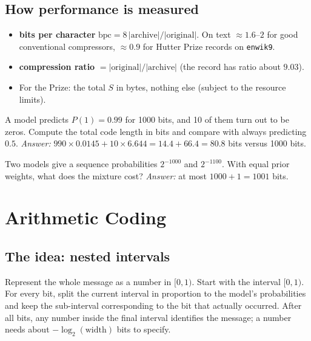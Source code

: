 \documentclass[11pt,a4paper,openany]{book}
\newcommand{\bpc}{\mathrm{bpc}}
\newcommand{\code}[1]{\texttt{#1}}
\theoremstyle{definition}
\theoremstyle{remark}
\begin{document}
\section{How performance is measured}

\begin{itemize}
\item \textbf{bits per character} $\bpc = 8\,|\text{archive}|/|\text{original}|$. On text $\approx 1.6$--$2$ for good conventional compressors, $\approx 0.9$ for Hutter Prize records on \code{enwik9}.
\item \textbf{compression ratio} $=|\text{original}|/|\text{archive}|$ (the record has ratio about $9.03$).
\item For the Prize: the total $S$ in bytes, nothing else (subject to the resource limits).
\end{itemize}

\begin{exercise}
A model predicts $P(1)=0.99$ for 1000 bits, and 10 of them turn out to be zeros. Compute the total code length in bits and compare with always predicting $0.5$. \emph{Answer:} $990\times0.0145+10\times6.644=14.4+66.4=80.8$ bits versus 1000 bits.
\end{exercise}

\begin{exercise}
Two models give a sequence probabilities $2^{-1000}$ and $2^{-1100}$. With equal prior weights, what does the mixture cost? \emph{Answer:} at most $1000+1=1001$ bits.
\end{exercise}

\chapter{Arithmetic Coding}

\section{The idea: nested intervals}

Represent the whole message as a number in $[0,1)$. Start with the interval $[0,1)$. For every bit, split the current interval in proportion to the model's probabilities and keep the sub-interval corresponding to the bit that actually occurred. After all bits, any number inside the final interval identifies the message; a number needs about $-\log_2(\text{width})$ bits to specify.
\end{document}
